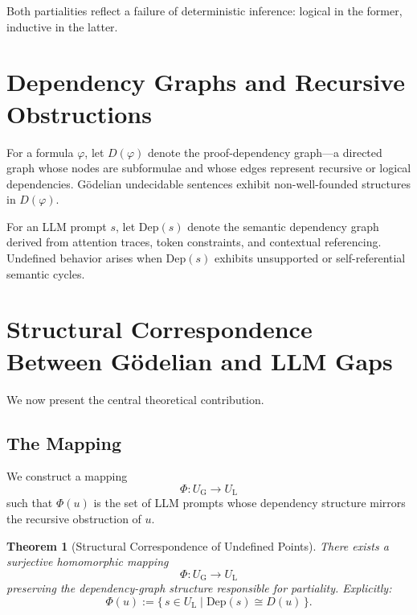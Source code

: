 \documentclass{article}
\newtheorem{theorem}{Theorem}
\begin{document}
Both partialities reflect a failure of deterministic inference:
logical in the former, inductive in the latter.

\section{Dependency Graphs and Recursive Obstructions}

For a formula $\varphi$, let $D(\varphi)$ denote the proof-dependency
graph---a directed graph whose nodes are subformulae and whose edges
represent recursive or logical dependencies.  
Gödelian undecidable sentences exhibit non-well-founded structures in
$D(\varphi)$.

For an LLM prompt $s$, let $\mathrm{Dep}(s)$ denote the semantic
dependency graph derived from attention traces, token constraints, and
contextual referencing.  
Undefined behavior arises when $\mathrm{Dep}(s)$ exhibits unsupported or
self-referential semantic cycles.

\section{Structural Correspondence Between Gödelian and LLM Gaps}

We now present the central theoretical contribution.

\subsection{The Mapping}

We construct a mapping
\[
    \Phi : U_{\mathrm{G}} \longrightarrow U_{\mathrm{L}}
\]
such that $\Phi(u)$ is the set of LLM prompts whose dependency structure
mirrors the recursive obstruction of $u$.

\begin{theorem}[Structural Correspondence of Undefined Points]
There exists a surjective homomorphic mapping
\[
    \Phi : U_{\mathrm{G}} \rightarrow U_{\mathrm{L}}
\]
preserving the dependency-graph structure responsible for partiality.
Explicitly:
\[
    \Phi(u) := 
    \{\, s \in U_{\mathrm{L}} \mid 
    \mathrm{Dep}(s) \cong D(u) \,\}.
\]
\end{theorem}
\end{document}
